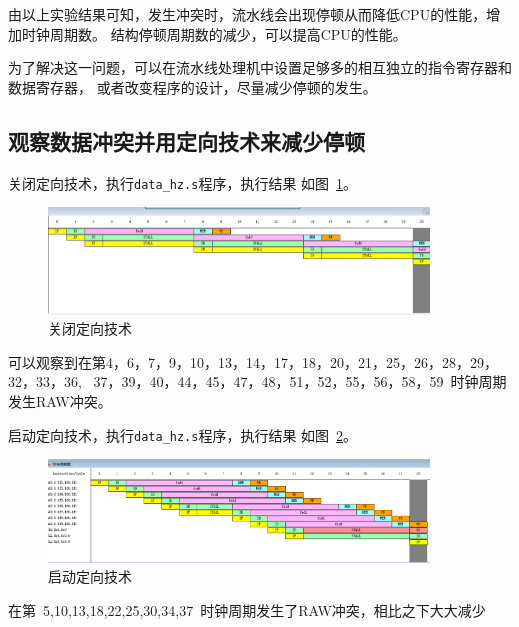 \documentclass[a4paper,twoside]{article}
\begin{document}
\begin{spacing}{1.2}
由以上实验结果可知，发生冲突时，流水线会出现停顿从而降低CPU的性能，增加时钟周期数。
结构停顿周期数的减少，可以提高CPU的性能。

为了解决这一问题，可以在流水线处理机中设置足够多的相互独立的指令寄存器和数据寄存器，
或者改变程序的设计，尽量减少停顿的发生。

\subsection{观察数据冲突并用定向技术来减少停顿}

关闭定向技术，执行\texttt{data\_hz.s}程序，执行结果
如图~\ref{fig:nofwd}。
\begin{figure}[htb]
	\centering
	\includegraphics[width=0.9\textwidth]{images/nofwd.png}
	\caption{关闭定向技术}
	\label{fig:nofwd}
\end{figure}

可以观察到在第4，6，7，9，10，13，14，17，18，20，21，25，26，28，29，32，33，36,
 37，39，40，44，45，47，48，51，52，55，56，58，59 时钟周期发生RAW冲突。

启动定向技术，执行\texttt{data\_hz.s}程序，执行结果
如图~\ref{fig:withfwd}。
\begin{figure}[htb]
	\centering
	\includegraphics[width=0.9\textwidth]{images/fwd.png}
	\caption{启动定向技术}
	\label{fig:withfwd}
\end{figure}
在第 5,10,13,18,22,25,30,34,37 时钟周期发生了RAW冲突，相比之下大大减少


\end{spacing}
\end{document}
